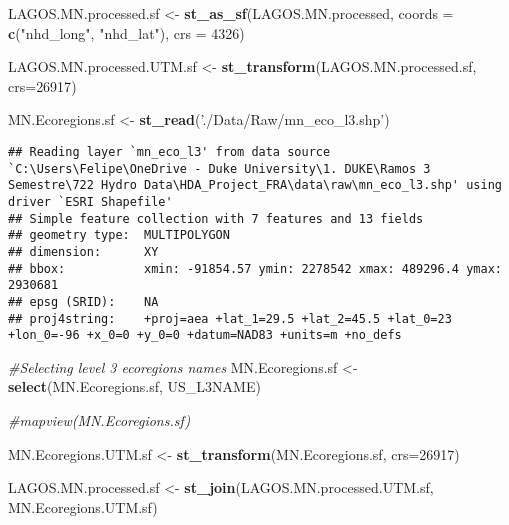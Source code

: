 \documentclass[]{article}
\newenvironment{Shaded}{\begin{snugshade}}{\end{snugshade}}
\newcommand{\CommentTok}[1]{\textcolor[rgb]{0.56,0.35,0.01}{\textit{#1}}}
\newcommand{\DataTypeTok}[1]{\textcolor[rgb]{0.13,0.29,0.53}{#1}}
\newcommand{\DecValTok}[1]{\textcolor[rgb]{0.00,0.00,0.81}{#1}}
\newcommand{\KeywordTok}[1]{\textcolor[rgb]{0.13,0.29,0.53}{\textbf{#1}}}
\newcommand{\NormalTok}[1]{#1}
\newcommand{\StringTok}[1]{\textcolor[rgb]{0.31,0.60,0.02}{#1}}
\begin{document}
\begin{Shaded}
\begin{Highlighting}[]
\NormalTok{LAGOS.MN.processed.sf <-}\StringTok{ }\KeywordTok{st_as_sf}\NormalTok{(LAGOS.MN.processed, }\DataTypeTok{coords =} \KeywordTok{c}\NormalTok{(}\StringTok{"nhd_long"}\NormalTok{, }\StringTok{"nhd_lat"}\NormalTok{), }\DataTypeTok{crs =} \DecValTok{4326}\NormalTok{)}

\NormalTok{LAGOS.MN.processed.UTM.sf <-}\StringTok{ }\KeywordTok{st_transform}\NormalTok{(LAGOS.MN.processed.sf, }\DataTypeTok{crs=}\DecValTok{26917}\NormalTok{)}

\NormalTok{MN.Ecoregions.sf <-}\StringTok{ }\KeywordTok{st_read}\NormalTok{(}\StringTok{'./Data/Raw/mn_eco_l3.shp'}\NormalTok{)}
\end{Highlighting}
\end{Shaded}

\begin{verbatim}
## Reading layer `mn_eco_l3' from data source `C:\Users\Felipe\OneDrive - Duke University\1. DUKE\Ramos 3 Semestre\722 Hydro Data\HDA_Project_FRA\data\raw\mn_eco_l3.shp' using driver `ESRI Shapefile'
## Simple feature collection with 7 features and 13 fields
## geometry type:  MULTIPOLYGON
## dimension:      XY
## bbox:           xmin: -91854.57 ymin: 2278542 xmax: 489296.4 ymax: 2930681
## epsg (SRID):    NA
## proj4string:    +proj=aea +lat_1=29.5 +lat_2=45.5 +lat_0=23 +lon_0=-96 +x_0=0 +y_0=0 +datum=NAD83 +units=m +no_defs
\end{verbatim}

\begin{Shaded}
\begin{Highlighting}[]
\CommentTok{#Selecting level 3 ecoregions names}
\NormalTok{MN.Ecoregions.sf <-}\StringTok{ }\KeywordTok{select}\NormalTok{(MN.Ecoregions.sf, US_L3NAME)}

\CommentTok{#mapview(MN.Ecoregions.sf)}

\NormalTok{MN.Ecoregions.UTM.sf <-}\StringTok{ }\KeywordTok{st_transform}\NormalTok{(MN.Ecoregions.sf, }\DataTypeTok{crs=}\DecValTok{26917}\NormalTok{)}

\NormalTok{LAGOS.MN.processed.sf <-}\StringTok{ }\KeywordTok{st_join}\NormalTok{(LAGOS.MN.processed.UTM.sf, MN.Ecoregions.UTM.sf)}
\end{Highlighting}
\end{Shaded}
\end{document}
